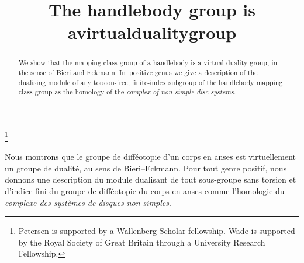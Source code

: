 \documentclass[JEP,XML,SOM,Unicode,NoFloatCountersInSection,published]{cedram}
\theoremstyle{plain}
\theoremstyle{definition}
\begin{document}
\frontmatter
\title{The handlebody group is a\nobreakspace virtual\nobreakspace duality\nobreakspace group}

\author[\initial{D.} \lastname{Petersen}]{ }
\address{Matematiska institutionen,
Stockholms Universitet,\\
106 91 Stockholm, 
Sweden}

\author[\initial{R.} \middlename{D.} \lastname{Wade}]{  }
\address{Mathematics Institute, 
Zeeman Building, 
University of Warwick,\\ 
Coventry 
CV4 7AL,
United Kingdom}

\thanks{Petersen is supported by a Wallenberg Scholar fellowship. Wade is supported by the Royal Society of Great Britain through a University Research Fellowship.}

\begin{abstract}
We show that the mapping class group of a handlebody is a virtual duality group, in the sense of Bieri and Eckmann. In~positive genus we give a description of the dualising module of any torsion-free, finite-index subgroup of the handlebody mapping class group as the homology of the \emph{complex of non-simple disc systems}.
\end{abstract}





\begin{altabstract}
Nous montrons que le groupe de difféotopie d'un corps en anses est virtuellement un groupe de dualité, au sens de Bieri--Eckmann. Pour tout genre positif, nous donnons une description du module dualisant de tout sous-groupe sans torsion et d'indice fini du groupe de difféotopie du corps en anses comme l'homologie du \emph{complexe des systèmes de disques non simples}.
\end{altabstract}

\maketitle
\vspace*{-\baselineskip}
\tableofcontents
\mainmatter
\end{document}
